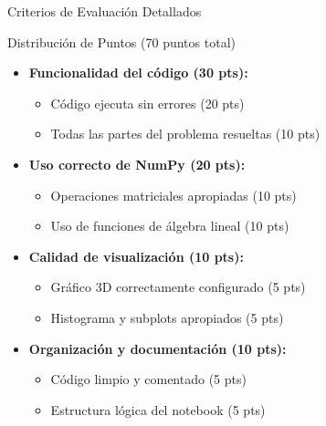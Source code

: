 \documentclass[10pt]{beamer}
\begin{document}
\begin{frame}{Criterios de Evaluación Detallados}
  \begin{block}{Distribución de Puntos (70 puntos total)}
    \begin{itemize}
      \item \textbf{Funcionalidad del código (30 pts):}
        \begin{itemize}
          \item Código ejecuta sin errores (20 pts)
          \item Todas las partes del problema resueltas (10 pts)
        \end{itemize}
      \item \textbf{Uso correcto de NumPy (20 pts):}
        \begin{itemize}
          \item Operaciones matriciales apropiadas (10 pts)
          \item Uso de funciones de álgebra lineal (10 pts)
        \end{itemize}
      \item \textbf{Calidad de visualización (10 pts):}
        \begin{itemize}
          \item Gráfico 3D correctamente configurado (5 pts)
          \item Histograma y subplots apropiados (5 pts)
        \end{itemize}
      \item \textbf{Organización y documentación (10 pts):}
        \begin{itemize}
          \item Código limpio y comentado (5 pts)
          \item Estructura lógica del notebook (5 pts)
        \end{itemize}
    \end{itemize}
  \end{block}
\end{frame}
\end{document}
